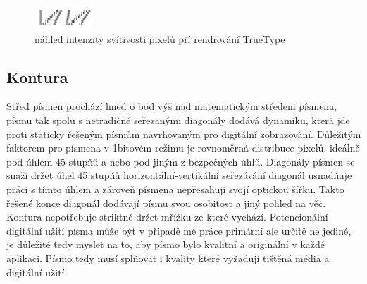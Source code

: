 \documentclass[a4paper]{article}
\begin{document}
\begin{figure}[H]
  \includegraphics[width=\linewidth]{pics/truetype_bw.png}
  \caption{náhled intenzity svítivosti pixelů pří rendrování TrueType}
\end{figure}


\subsection{Kontura}
Střed písmen prochází hned o bod výš nad matematickým středem písmena, písmu tak spolu s netradičně seřezanými diagonály dodává dynamiku, která jde proti staticky řešeným písmům navrhovaným pro digitální zobrazování. Důležitým faktorem pro písmena v 1bitovém režimu je rovnoměrná distribuce pixelů, ideálně pod úhlem 45 stupňů a nebo pod jiným z bezpečných úhlů. Diagonály písmen se snaží držet úhel 45 stupňů horizontální-vertikální seřezávání diagonál usnadňuje práci s tímto úhlem a zároveň písmena nepřesahují svojí optickou šířku. Takto řešené konce diagonál dodávají písmu svou osobitost a jiný pohled na věc. Kontura nepotřebuje striktně držet mřížku ze které vychází. Potencionální digitální užití písma může být v případě mé práce primární ale určitě ne jediné, je důležité tedy myslet na to, aby písmo bylo kvalitní a originální v každé aplikaci. Písmo tedy musí splňovat i kvality které vyžadují tištěná média a digitální užití.
\end{document}
